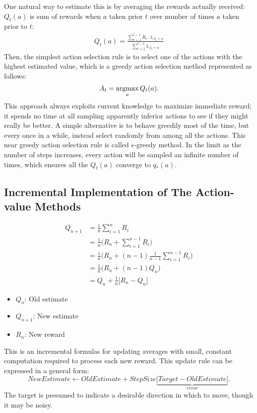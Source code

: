 One natural way to estimate this is by averaging the rewards actually received: $Q_t(a)$ is sum of rewards when $a$ taken prior $t$ over number of times $a$ taken prior to $t$:
\begin{align*}
	Q_t(a) = \frac{\sum_{t=1}^{t-1}R_i \cdot \mathds{1}_{A_i=a}}{\sum_{t=1}^{t-1}\mathds{1}_{A_i=a}}
\end{align*}
Then, the simplest action selection rule is to select one of the actions with the highest estimated value, which is a greedy action selection method represented as follows:
$$A_t=\operatorname*{\operatorname{argmax}}_{a}Q_t(a).$$
This approach always exploits current knowledge to maximize immediate reward; it spends no time at all sampling apparently inferior actions to see if they might really be better. A simple alternative is to behave greedily most of the time, but every once in a while, instead select randomly from among all the actions. This near greedy action selection rule is called $\epsilon$-greedy method. In the limit as the number of steps increases, every action will be sampled an infinite number of times, which ensures all the $Q_t(a)$ converge to $q_*(a)$.

\subsection{Incremental Implementation of The Action-value Methods}
\begin{align*}
	Q_{n+1} &= \frac{1}{n}\sum_{i=1}^{n}R_i\\
	&= \frac{1}{n} \Bigg(R_n + \sum_{i=1}^{n-1}R_i \Bigg)\\
	&= \frac{1}{n} \Bigg(R_n + (n-1)\frac{1}{n-1} \sum_{i=1}^{n-1}R_i \Bigg)\\
	&= \frac{1}{n} \Bigg(R_n + (n-1)Q_n \Bigg)\\
	&=  Q_n + \frac{1}{n} \Big[R_n - Q_n \Big]
\end{align*}
\begin{itemize}
	\item $Q_n$: Old estimate
	\item $Q_{n+1}$: New estimate
	\item $R_{n}$: New reward
\end{itemize}

This is an incremental formulas for updating averages with small, constant computation required to process each new reward. This update rule can be expressed in a general form:
$$NewEstimate \leftarrow OldEstimate + StepSize \underbrace{\Big[Target - OldEstimate \Big]}_{error}.$$
The target is presumed to indicate a desirable direction in which to move, though it may be noisy.


